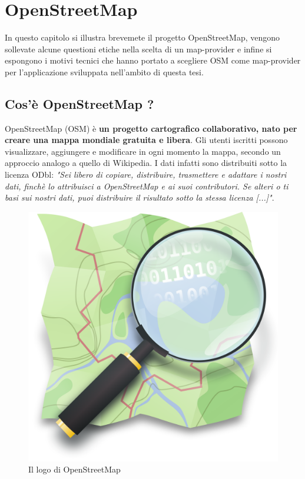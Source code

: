 \chapter{OpenStreetMap}
\label{cap:OpenStreetMap}
In questo capitolo si illustra brevemete il progetto OpenStreetMap, vengono sollevate alcune questioni etiche nella scelta di un map-provider e infine si espongono i motivi tecnici che hanno portato a scegliere OSM come map-provider per l'applicazione sviluppata nell'ambito di questa tesi.
\section{Cos'è OpenStreetMap ?}
OpenStreetMap (OSM) è \textbf {un progetto cartografico collaborativo, nato per creare una mappa mondiale gratuita e libera}. Gli utenti iscritti possono visualizzare, aggiungere e modificare in ogni momento la mappa, secondo un approccio analogo a quello di Wikipedia. I dati infatti sono distribuiti sotto la licenza ODbl\cite{LICENZA_OSM}: \textit{"Sei libero di copiare, distribuire, trasmettere e adattare i nostri dati, finchè lo attribuisci a OpenStreetMap e ai suoi contributori. Se alteri o ti basi sui nostri dati, puoi distribuire il risultato sotto la stessa licenza [...]"}.\\
\begin{figure}[H]
	\centering
	\includegraphics[scale=0.1]{OpenStreetMap/logo.png}
	\caption{Il logo di OpenStreetMap}
	\label{fig:logo_OSM}
\end{figure}
